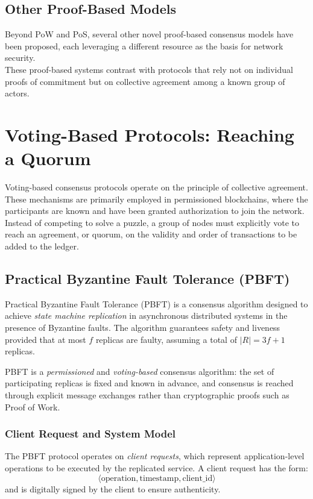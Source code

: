 \documentclass{scrbook}
\begin{document}
\section{Other Proof-Based Models}

Beyond PoW and PoS, several other novel proof-based consensus models have been proposed, each leveraging a different resource as the basis for network security. \\

These proof-based systems contrast with protocols that rely not on individual proofs of commitment but on collective agreement among a known group of actors.

\chapter{Voting-Based Protocols: Reaching a Quorum}

Voting-based consensus protocols operate on the principle of collective agreement. These mechanisms are primarily employed in permissioned blockchains, where the participants are known and have been granted authorization to join the network. Instead of competing to solve a puzzle, a group of nodes must explicitly vote to reach an agreement, or quorum, on the validity and order of transactions to be added to the ledger.

\section{Practical Byzantine Fault Tolerance (PBFT)}

Practical Byzantine Fault Tolerance (PBFT) is a consensus algorithm designed to achieve
\emph{state machine replication} in asynchronous distributed systems in the presence of
Byzantine faults. The algorithm guarantees safety and liveness provided that at most
$f$ replicas are faulty, assuming a total of $|R| = 3f + 1$ replicas.

PBFT is a \emph{permissioned} and \emph{voting-based} consensus algorithm: the set of
participating replicas is fixed and known in advance, and consensus is reached through
explicit message exchanges rather than cryptographic proofs such as Proof of Work.

\subsection{Client Request and System Model}

The PBFT protocol operates on \emph{client requests}, which represent application-level
operations to be executed by the replicated service. A client request has the form:
\[
\langle \text{operation}, \text{timestamp}, \text{client\_id} \rangle
\]
and is digitally signed by the client to ensure authenticity.
\end{document}
